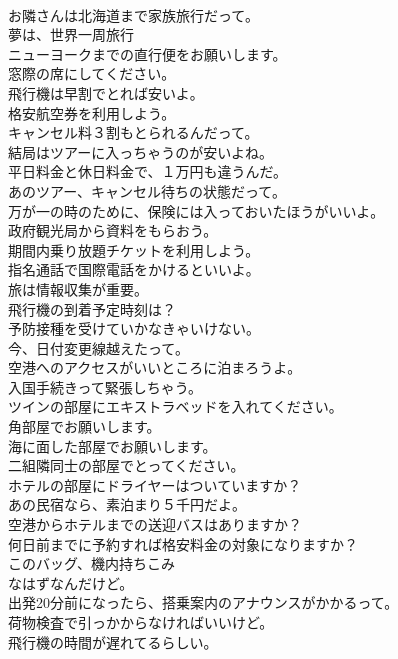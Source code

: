 \documentclass[8pt]{extreport}
\begin{document}
\begin{CJK}{UTF8}{min}
\\	お隣さんは北海道まで家族旅行だって。	
\\	夢は、世界一周旅行	
\\	ニューヨークまでの直行便をお願いします。	
\\	窓際の席にしてください。	
\\	飛行機は早割でとれば安いよ。	
\\	格安航空券を利用しよう。	
\\	キャンセル料３割もとられるんだって。	
\\	結局はツアーに入っちゃうのが安いよね。	
\\	平日料金と休日料金で、１万円も違うんだ。	
\\	あのツアー、キャンセル待ちの状態だって。	
\\	万が一の時のために、保険には入っておいたほうがいいよ。	
\\	政府観光局から資料をもらおう。	
\\	期間内乗り放題チケットを利用しよう。	
\\	指名通話で国際電話をかけるといいよ。	
\\	旅は情報収集が重要。	
\\	飛行機の到着予定時刻は？	
\\	予防接種を受けていかなきゃいけない。	
\\	今、日付変更線越えたって。	
\\	空港へのアクセスがいいところに泊まろうよ。	
\\	入国手続きって緊張しちゃう。	
\\	ツインの部屋にエキストラベッドを入れてください。	
\\	角部屋でお願いします。	
\\	海に面した部屋でお願いします。	
\\	二組隣同士の部屋でとってください。	
\\	ホテルの部屋にドライヤーはついていますか？	
\\	あの民宿なら、素泊まり５千円だよ。	
\\	空港からホテルまでの送迎バスはありますか？	
\\	何日前までに予約すれば格安料金の対象になりますか？	
\\	このバッグ、機内持ちこみ
\\	なはずなんだけど。	
\\	出発20分前になったら、搭乗案内のアナウンスがかかるって。	
\\	荷物検査で引っかからなければいいけど。	
\\	飛行機の時間が遅れてるらしい。	

\end{CJK}
\end{document}
